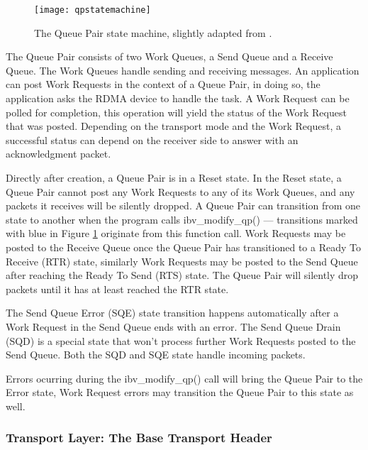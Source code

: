 \begin{figure}[h!]
  \centering
  \texttt{[image: qpstatemachine]}
  \caption[Queue Pair state machine]{The Queue Pair state machine, slightly adapted from \cite{QPStateMachine2012}.}
  \label{fig:qpstatemachine}
\end{figure}


The Queue Pair consists of two Work Queues, a Send Queue and a Receive
Queue. The Work Queues handle sending and receiving messages.
An application can post Work Requests in the context of a Queue Pair, in
doing so, the application asks the RDMA device to handle the task.
A Work Request can be polled for completion, this operation will yield
the status of the Work Request that was posted. Depending on the transport
mode and the Work Request, a successful status can depend on the receiver
side to answer with an acknowledgment packet.


Directly after creation, a Queue Pair is in a Reset state. In the Reset state,
a Queue Pair cannot post any Work Requests to any
of its Work Queues, and any packets it receives will be silently dropped.
A Queue Pair can transition from one state to another when the program calls ibv\_modify\_qp() ---
transitions marked with blue in Figure \ref{fig:qpstatemachine} originate from this function call.
Work Requests may be posted to the Receive Queue once the Queue Pair has transitioned to a Ready To Receive (RTR) state,
similarly Work Requests may be posted to the Send Queue after reaching the Ready To Send (RTS) state. The Queue Pair will silently drop
packets until it has at least reached the RTR state.

The Send Queue Error (SQE) state transition happens automatically
after a Work Request in the Send Queue ends with an error\cite{QPStateMachine2012}. The Send Queue Drain (SQD) is a special state
that won't process further Work Requests posted to the Send Queue\cite{QPStateMachine2012}. Both the SQD and SQE state handle incoming packets\cite{barakVerbsProgrammingTutorial2014}.

Errors ocurring during the ibv\_modify\_qp() call will bring the Queue Pair
to the Error state, Work Request errors may transition the Queue Pair to this state as well\cite{QPStateMachine2012}.


\subsubsection{Transport Layer: The Base Transport Header} %

